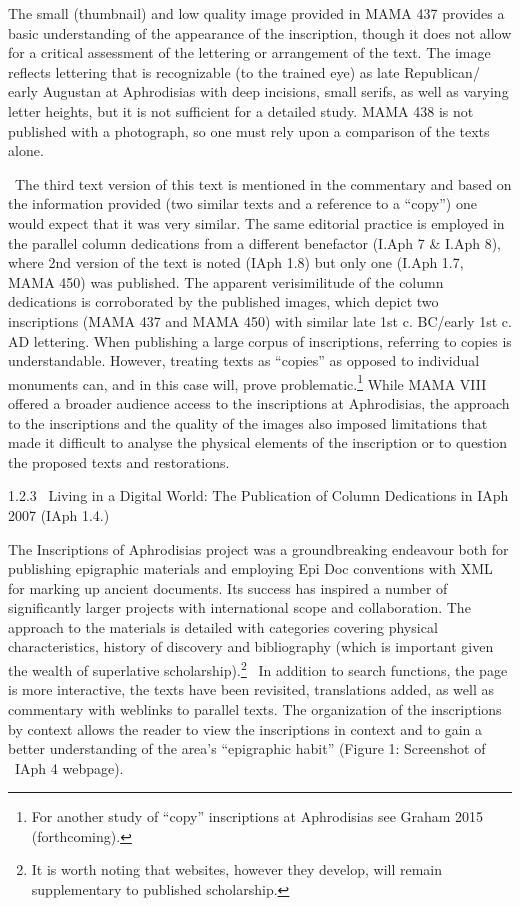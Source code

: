 \documentclass[amsthm,ebook]{saparticle}
\begin{document}
\bigskip

The small (thumbnail) and low quality image provided in MAMA 437 provides a basic understanding of the appearance of the
inscription, though it does not allow for a critical assessment of the lettering or arrangement of the text. The image
reflects lettering that is recognizable (to the trained eye) as late Republican/ early Augustan at Aphrodisias with
deep incisions, small serifs, as well as varying letter heights, but it is not sufficient for a detailed study. MAMA
438 is not published with a photograph, so one must rely upon a comparison of the texts alone.


\bigskip

\ The third text version of this text is mentioned in the commentary and based on the information provided (two similar
texts and a reference to a “copy”) one would expect that it was very similar. The same editorial practice is employed
in the parallel column dedications from a different benefactor (I.Aph 7 \& I.Aph 8), where 2nd version of the text is
noted (IAph 1.8) but only one (I.Aph 1.7, MAMA 450) was published. The apparent verisimilitude of the column
dedications is corroborated by the published images, which depict two inscriptions (MAMA 437 and MAMA 450) with similar
late 1st c. BC/early 1st c. AD lettering. When publishing a large corpus of inscriptions, referring to copies is
understandable. However, treating texts as “copies” as opposed to individual monuments can, and in this case will,
prove problematic.\footnote{ For another study of “copy” inscriptions at Aphrodisias see Graham 2015 (forthcoming).}
While MAMA VIII offered a broader audience access to the inscriptions at Aphrodisias, the approach to the inscriptions
and the quality of the images also imposed limitations that made it difficult to analyse the physical elements of the
inscription or to question the proposed texts and restorations. \ 

1.2.3 \ Living in a Digital World: The Publication of Column Dedications in IAph 2007 (IAph 1.4.)


\bigskip

The Inscriptions of Aphrodisias project was a groundbreaking endeavour both for publishing epigraphic materials and
employing Epi Doc conventions with XML for marking up ancient documents. Its success has inspired a number of
significantly larger projects with international scope and collaboration. The approach to the materials is detailed
with categories covering physical characteristics, history of discovery and bibliography (which is important given the
wealth of superlative scholarship).\footnote{ It is worth noting that websites, however they develop, will remain
supplementary to published scholarship.} \ In addition to search functions, the page is more interactive, the texts
have been revisited, translations added, as well as commentary with weblinks to parallel texts. The organization of the
inscriptions by context allows the reader to view the inscriptions in context and to gain a better understanding of the
area’s “epigraphic habit” (Figure 1: Screenshot of \ IAph 4 webpage).
\end{document}
